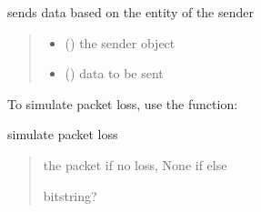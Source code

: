 \documentclass[letterpaper,10pt,english,openany,oneside]{sphinxmanual}
\begin{document}
\begin{fulllineitems}

\begin{fulllineitems}
\label{\detokenize{index:rdt_protocol.ReliableDataTransferEntity.send}}
\pysigstartsignatures
\pysiglinewithargsret
{}
{}
{}
\pysigstopsignatures
\sphinxAtStartPar
sends data based on the entity of the sender
\begin{quote}\begin{description}
\begin{itemize}
\item {} 
\sphinxAtStartPar
{} ({\hyperref[\detokenize{index:rdt_protocol.ReliableDataTransferEntity}]{}}) \textendash{} the sender object

\item {} 
\sphinxAtStartPar
{} () \textendash{} data to be sent

\end{itemize}

\end{description}\end{quote}

\end{fulllineitems}


\end{fulllineitems}


\sphinxAtStartPar
To simulate packet loss, use the  function:

\begin{fulllineitems}
\label{\detokenize{index:intermediary.simulate_loss}}
\pysigstartsignatures
\pysiglinewithargsret
{}
{}
{}
\pysigstopsignatures
\sphinxAtStartPar
simulate packet loss
\begin{quote}\begin{description}
\sphinxAtStartPar
the packet if no loss, None if else

\sphinxAtStartPar
bitstring?

\end{description}\end{quote}

\end{fulllineitems}
\end{document}
